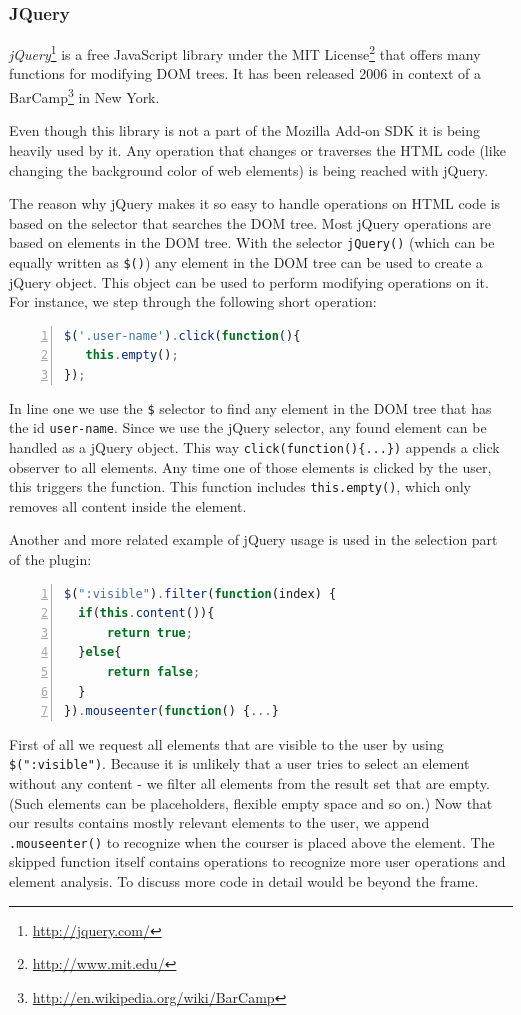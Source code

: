 \subsubsection*{JQuery}
\emph{jQuery}\footnote{\url{http://jquery.com/}} is a free JavaScript library under the MIT License\footnote{\url{http://www.mit.edu/}} that offers many functions for modifying DOM trees. It has been released 2006 in context of a BarCamp\footnote{\url{http://en.wikipedia.org/wiki/BarCamp}} in New York.

Even though this library is not a part of the Mozilla Add-on SDK it is being heavily used by it. Any operation that changes or traverses the HTML code (like changing the background color of web elements) is being reached with jQuery.

The reason why jQuery makes it so easy to handle operations on HTML code is based on the selector that searches the DOM tree. Most jQuery operations are based on elements in the DOM tree. With the selector \verb+jQuery()+ (which can be equally written as \verb+$()+) any element in the DOM tree can be used to create a jQuery object. This object can be used to perform modifying operations on it. For instance, we step through the following short operation:
\begin{lstlisting}[language=JavaScript, numbers=left]
$('.user-name').click(function(){
   this.empty();
});
\end{lstlisting}

In line one we use the \verb+$+ selector to find any element in the DOM tree that has the id \verb+user-name+. Since we use the jQuery selector, any found element can be handled as a jQuery object. This way \verb+click(function(){...})+ appends a click observer to all elements. Any time one of those elements is clicked by the user, this triggers the function. This function includes \verb+this.empty()+, which only removes all content inside the element. 

Another and more related example of jQuery usage is used in the selection part of the plugin:
\begin{lstlisting}[language=JavaScript, numbers=left]
$(":visible").filter(function(index) {
  if(this.content()){
      return true;
  }else{
      return false;
  }
}).mouseenter(function() {...}
\end{lstlisting} 

First of all we request all elements that are visible to the user by using \verb+$(":visible")+. Because it is unlikely that a user tries to select an element without any content - we filter all elements from the result set that are empty. (Such elements can be placeholders, flexible empty space and so on.) Now that our results contains mostly relevant elements to the user, we append \verb+.mouseenter()+ to recognize when the courser is placed above the element. The skipped function itself contains operations to recognize more user operations and element analysis. To discuss more code in detail would be beyond the frame. 

